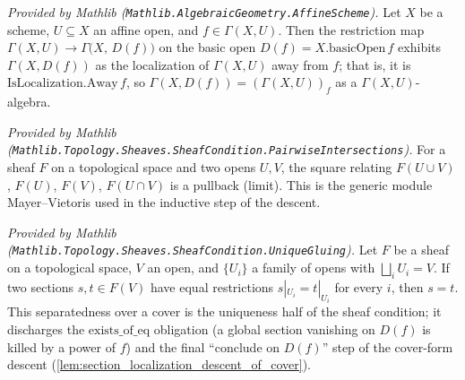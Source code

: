 \begin{lemma}
  \label{lem:isLocalization_basicOpen_mathlib}
  \mathlibok
  \textit{Provided by Mathlib
  (\texttt{Mathlib.AlgebraicGeometry.AffineScheme}).}
  Let \(X\) be a scheme, \(U \subseteq X\) an affine open, and
  \(f \in \Gamma(X, U)\). Then the restriction map
  \(\Gamma(X, U) \to \Gamma\bigl(X,\, D(f)\bigr)\) on the basic open
  \(D(f) = X.\mathrm{basicOpen}\,f\) exhibits \(\Gamma(X, D(f))\) as the
  localization of \(\Gamma(X, U)\) away from \(f\); that is, it is
  \(\mathrm{IsLocalization.Away}\,f\), so
  \(\Gamma(X, D(f)) = (\Gamma(X, U))_f\) as a \(\Gamma(X,U)\)-algebra.
\end{lemma}






\begin{lemma}
  \label{lem:isLimitPullbackCone_mathlib}
  \mathlibok
  \textit{Provided by Mathlib
  (\texttt{Mathlib.Topology.Sheaves.SheafCondition.PairwiseIntersections}).}
  For a sheaf \(F\) on a topological space and two opens \(U, V\), the square relating
  \(F(U \cup V)\), \(F(U)\), \(F(V)\), \(F(U \cap V)\) is a pullback (limit). This is the generic
  module Mayer--Vietoris used in the inductive step of the descent.
\end{lemma}


\begin{lemma}
  \label{lem:eq_of_locally_eq_mathlib}
  \mathlibok
  \textit{Provided by Mathlib
  (\texttt{Mathlib.Topology.Sheaves.SheafCondition.UniqueGluing}).}
  Let \(F\) be a sheaf on a topological space, \(V\) an open, and \(\{U_i\}\) a family of opens with
  \(\bigsqcup_i U_i = V\). If two sections \(s, t \in F(V)\) have equal restrictions
  \(s|_{U_i} = t|_{U_i}\) for every \(i\), then \(s = t\). This separatedness over a cover is the
  uniqueness half of the sheaf condition; it discharges the \(\mathrm{exists\_of\_eq}\) obligation
  (a global section vanishing on \(D(f)\) is killed by a power of \(f\)) and the final
  ``conclude on \(D(f)\)'' step of the cover-form descent
  (\cref{lem:section_localization_descent_of_cover}).
\end{lemma}

